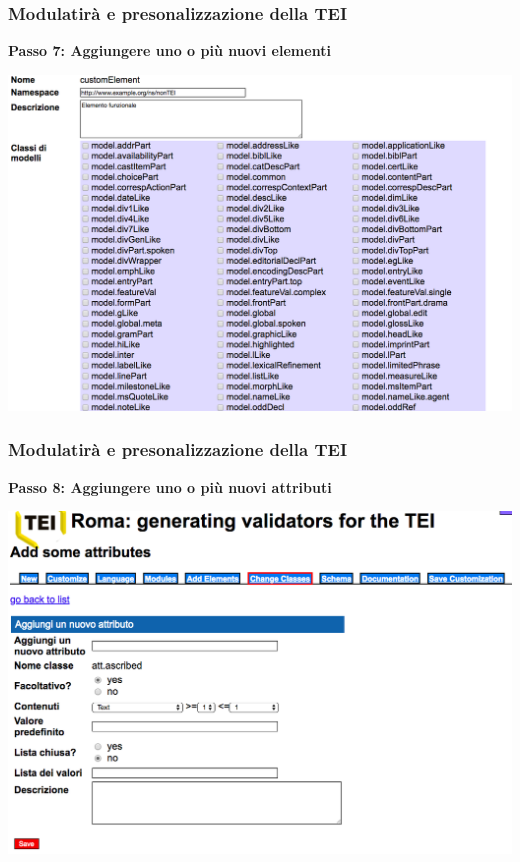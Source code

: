     
\begin{frame}
    \frametitle{Modulatirà e presonalizzazione della TEI}
    \addtocounter{nframe}{1}
    
    \textbf{Passo 7: Aggiungere uno o più nuovi elementi}

     \begin{center}
        \includegraphics[width=.9\textwidth]{imgs/Roma9.png}
     \end{center}
    
\end{frame}
   
\begin{frame}
    \frametitle{Modulatirà e presonalizzazione della TEI}
    \addtocounter{nframe}{1}
    
    \textbf{Passo 8: Aggiungere uno o più nuovi attributi}

     \begin{center}
        \includegraphics[width=.9\textwidth]{imgs/Roma14.png}
     \end{center}
     
    
\end{frame}
    
